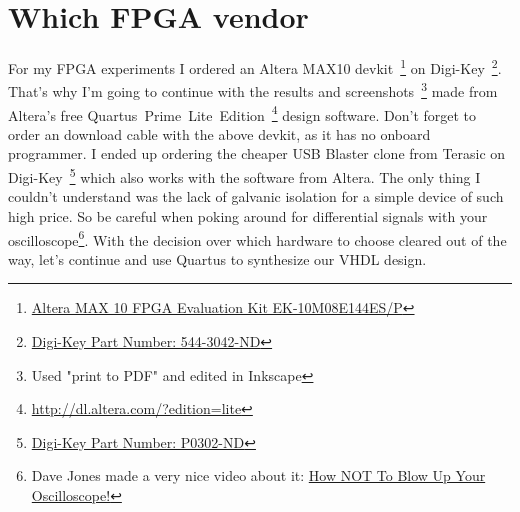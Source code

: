 \documentclass[a4paper]{article}
\begin{document}
\section{Which FPGA vendor}
For my FPGA experiments I ordered an Altera MAX10 devkit~\footnote{\href{https://www.altera.com/products/boards_and_kits/dev-kits/altera/kit-max-10-evaluation.html}{Altera MAX 10 FPGA Evaluation Kit EK-10M08E144ES/P}} on Digi-Key~\footnote{\href{http://www.digikey.de/short/3pd4ch}{Digi-Key Part Number: 544-3042-ND}}.
That's why I'm going to continue with the results and screenshots~\footnote{Used "print to PDF" and edited in Inkscape} made from Altera's free Quartus~Prime~Lite~Edition~\footnote{\url{http://dl.altera.com/?edition=lite}} design software.
Don't forget to order an download cable with the above devkit, as it has no onboard programmer.
I ended up ordering the cheaper USB Blaster clone from Terasic on Digi-Key~\footnote{\href{http://www.digikey.de/short/3pd4j9}{Digi-Key Part Number: P0302-ND}} which also works with the software from Altera.
The only thing I couldn't understand was the lack of galvanic isolation for a simple device of such high price.
So be careful when poking around for differential signals with your oscilloscope\footnote{Dave Jones made a very nice video about it: \href{https://youtu.be/xaELqAo4kkQ}{How NOT To Blow Up Your Oscilloscope!}}.
With the decision over which hardware to choose cleared out of the way, let's continue and use Quartus to synthesize our VHDL design.
\newpage
\end{document}
